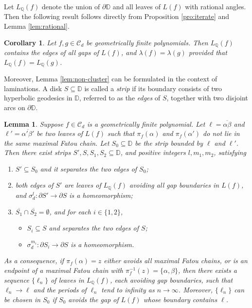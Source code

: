 \documentclass[a4paper,reqno,times, 11pt]{amsart}
\newtheorem{lemma}[theorem]{Lemma}
\newtheorem{corollary}[theorem]{Corollary}
\theoremstyle{remark}
\theoremstyle{plain}
\numberwithin{equation}{section}
\def\CCCC{\mathscr C}
\def\D{\mathbb D}
\def\Q{\mathbb Q}
\begin{document}
	Let $L_\Q(f)$ denote the union of $\partial\D$ and all leaves of $L(f)$ with rational angles. Then the following result follows directly from Proposition \ref{pro:iterate} and Lemma \ref{lem:rational}.
	
	\begin{corollary}\label{coro:same}
		Let $f,g\in\CCCC_d$ be  geometrically finite polynomials. Then  $L_\Q(f)$ contains the edges of all gaps of $L(f)$, and $\lambda(f)=\lambda(g)$ provided that $L_\Q(f)=L_\Q(g)$.
	\end{corollary}
	
	Moreover, Lemma \ref{lem:non-cluster} can be formulated in the context of laminations. A disk $S \subseteq \mathbb{D}$ is called a \emph{strip} if its boundary  consists of two hyperbolic geodesics in $\D$, referred to as the \emph{edges} of $S$, together with two disjoint arcs on $\partial \mathbb{D}$. %
	\begin{lemma}\label{lem:lamination-version}
		Suppose $f\in\CCCC_d$ is a geometrically finite polynomial. Let $\ell=\overline{\alpha\beta}$ and $\ell'=\overline{\alpha'\beta'}$ be two leaves of $L(f)$ such that $\pi_f(\alpha)$ and $\pi_f(\alpha')$ do not lie in the same maximal Fatou chain.   Let $S_0\subseteq \D$ be the strip bounded by $\ell$ and $\ell'$. Then there exist strips $S',S,S_1,S_2\subseteq \D$, and positive integers $l,m_1,m_2$, satisfying
		\begin{enumerate}
			\item $S'\subseteq S_0$ and it separates the two edges of $S_0$;\vspace{1pt}
			\item both edges of $S'$ are leaves of $L_\Q(f)$ avoiding all gap boundaries in $L(f)$, and $\sigma_d^l:\partial S'\to\partial S$ is a homeomorphism;\vspace{1pt}
			\item $\overline{S_1}\cap \overline{S_2}=\emptyset$, and for each $i\in\{1,2\}$,
			\begin{itemize}
				\item $S_i\subseteq S$ and separates the two edges of $S$;
				\item   $\sigma_d^{m_i}:\partial S_i\to\partial S$ is a homeomorphism.
			\end{itemize}
		\end{enumerate}
		
		As a consequence, if  $\pi_f(\alpha)=z$ either avoids all maximal Fatou chains, or is an endpoint of a maximal Fatou chain with $\pi_f^{-1}(z)=\{\alpha,\beta\}$, then there exists a sequence $\{\ell_n\} $ of leaves in $L_\Q(f)$, each avoiding gap boundaries, such that $\ell_n \to \ell$ and the periods of $\ell_n$ tend to infinity as $n \to \infty$. Moreover,  $\{\ell_n\}$ can be chosen in $S_0$ if  $S_0$ avoids the gap of $L(f)$ whose boundary contains $\ell$.
		\end{lemma}
\end{document}

